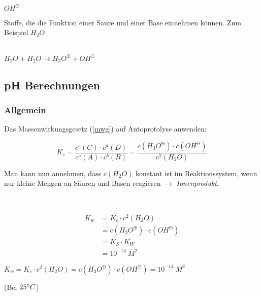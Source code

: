\begin{definition}
	{\large
		$OH^\ominus$
	}
\end{definition}

\begin{definition}[Ampholyte]
	Stoffe, die die Funktion einer Säure und einer Base einnehmen können. Zum Beispiel {\large $H_2O$}
\end{definition}

\begin{definition}\leavevmode \\

{\large
	$H_2O + H_2O \rightarrow H_3O^\oplus + OH^\ominus$	
}

\end{definition}

\subsection{pH Berechnungen}

\subsubsection{Allgemein}

Das Massenwirkungsgesetz (\ref{mwg}) auf Autoprotolyse anwenden:

{\large
	\begin{equation}
	K_c=\frac{c^c(C) \cdot c^d(D)}{c^a(A) \cdot c^b(B)}=\frac{c(H_3O^\oplus) \cdot c(OH^\ominus)}{c^2(H_2O)}
	\end{equation}
}

Man kann nun annehmen, dass $c(H_2O)$ konstant ist im Reaktionssystem, wenn nur kleine Mengen an Säuren und Basen reagieren $\rightarrow$ \textit{Ionenprodukt}.

\begin{definition}[Ionenprodukt]\leavevmode \\
	
	{\large
		\begin{equation}
		\begin{split}
		K_w & = K_c \cdot c^2(H_2O) \\
		       & = c(H_3O^\oplus) \cdot c(OH^\ominus) \\
		       & = K_S \cdot K_W \\
		       & = 10^{-14} \ M^2
		\end{split}
		\end{equation}
		
		$K_w=K_c \cdot c^2(H_2O)=c(H_3O^\oplus) \cdot c(OH^\ominus)=10^{-14}\ M^2$
	}
	(Bei $25\degree C$)
	
\end{definition}

